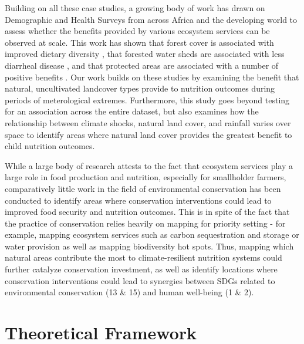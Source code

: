 \documentclass{article}
\begin{document}
Building on all these case studies, a growing body of work has drawn on Demographic and Health Surveys from across Africa and the developing world to assess whether the benefits provided by various ecosystem services can be observed at scale.  This work has shown that forest cover is associated with improved dietary diversity \cite{Ickowitz2014, Rasolofoson2018}, that forested water sheds are associated with less diarrheal disease \cite{Herrera2017}, and that protected areas are associated with a number of positive benefits \cite{Naidoo2019}.  Our work builds on these studies by examining the benefit that natural, uncultivated landcover types provide to nutrition outcomes during periods of meterological extremes.  Furthermore, this study goes beyond testing for an association across the entire dataset, but also examines how the relationship between climate shocks, natural land cover, and rainfall varies over space to identify areas where natural land cover provides the greatest benefit to child nutrition outcomes.

While a large body of research attests to the fact that ecosystem services play a large role in food production and nutrition, especially for smallholder farmers, comparatively little work in the field of environmental conservation has been conducted to identify areas where conservation interventions could lead to improved food security and nutrition outcomes.  This is in spite of the fact that the practice of conservation relies heavily on mapping for priority setting - for example, mapping ecosystem services such as carbon sequestration and storage or water provision as well as mapping biodiversity hot spots.  Thus, mapping which natural areas contribute the most to climate-resilient nutrition systems could further catalyze conservation investment, as well as identify locations where conservation interventions could lead to synergies between SDGs related to environmental conservation (13 \& 15) and human well-being (1 \& 2).

\section{Theoretical Framework}
\end{document}
